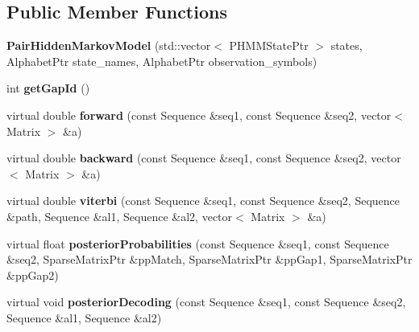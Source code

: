 \subsection*{Public Member Functions}
\begin{DoxyCompactItemize}
\item 
\mbox{\label{classtops_1_1PairHiddenMarkovModel_a19e515d14651c3b7e23c5db9eac760d1}} 
{\bfseries Pair\+Hidden\+Markov\+Model} (std\+::vector$<$ P\+H\+M\+M\+State\+Ptr $>$ states, Alphabet\+Ptr state\+\_\+names, Alphabet\+Ptr observation\+\_\+symbols)
\item 
\mbox{\label{classtops_1_1PairHiddenMarkovModel_a7632af79d8b22f5d0990f7aabb45fccf}} 
int {\bfseries get\+Gap\+Id} ()
\item 
\mbox{\label{classtops_1_1PairHiddenMarkovModel_ae3dbecd59d325f9af721ad430e15806a}} 
virtual double {\bfseries forward} (const Sequence \&seq1, const Sequence \&seq2, vector$<$ Matrix $>$ \&a)
\item 
\mbox{\label{classtops_1_1PairHiddenMarkovModel_a5df22f06a647c73d88526721427642ff}} 
virtual double {\bfseries backward} (const Sequence \&seq1, const Sequence \&seq2, vector$<$ Matrix $>$ \&a)
\item 
\mbox{\label{classtops_1_1PairHiddenMarkovModel_aabc6fcfe43c63660d99e98614a67df74}} 
virtual double {\bfseries viterbi} (const Sequence \&seq1, const Sequence \&seq2, Sequence \&path, Sequence \&al1, Sequence \&al2, vector$<$ Matrix $>$ \&a)
\item 
\mbox{\label{classtops_1_1PairHiddenMarkovModel_aeaec00915937f5349b087c59e99d5e44}} 
virtual float {\bfseries posterior\+Probabilities} (const Sequence \&seq1, const Sequence \&seq2, Sparse\+Matrix\+Ptr \&pp\+Match, Sparse\+Matrix\+Ptr \&pp\+Gap1, Sparse\+Matrix\+Ptr \&pp\+Gap2)
\item 
\mbox{\label{classtops_1_1PairHiddenMarkovModel_aef3afb4011467ac7f7d42f4a6a5322d7}} 
virtual void {\bfseries posterior\+Decoding} (const Sequence \&seq1, const Sequence \&seq2, Sequence \&al1, Sequence \&al2)

\end{DoxyCompactItemize}
